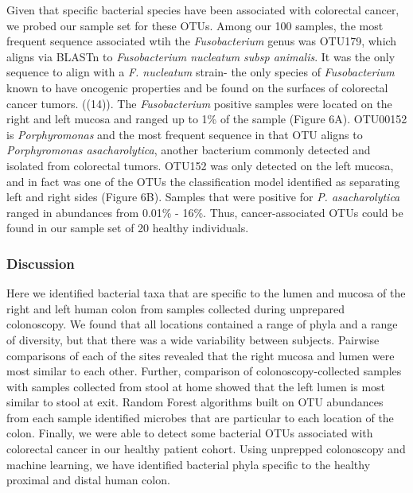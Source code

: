 \documentclass[11pt,]{article}
\begin{document}
Given that specific bacterial species have been associated with
colorectal cancer, we probed our sample set for these OTUs. Among our
100 samples, the most frequent sequence associated wtih the
\emph{Fusobacterium} genus was OTU179, which aligns via BLASTn to
\emph{Fusobacterium nucleatum subsp animalis}. It was the only sequence
to align with a \emph{F. nucleatum} strain- the only species of
\emph{Fusobacterium} known to have oncogenic properties and be found on
the surfaces of colorectal cancer tumors. ((14)). The
\emph{Fusobacterium} positive samples were located on the right and left
mucosa and ranged up to 1\% of the sample (Figure 6A). OTU00152 is
\emph{Porphyromonas} and the most frequent sequence in that OTU aligns
to \emph{Porphyromonas asacharolytica}, another bacterium commonly
detected and isolated from colorectal tumors. OTU152 was only detected
on the left mucosa, and in fact was one of the OTUs the classification
model identified as separating left and right sides (Figure 6B). Samples
that were positive for \emph{P. asacharolytica} ranged in abundances
from 0.01\% - 16\%. Thus, cancer-associated OTUs could be found in our
sample set of 20 healthy individuals.

\subsubsection{Discussion}\label{discussion}

Here we identified bacterial taxa that are specific to the lumen and
mucosa of the right and left human colon from samples collected during
unprepared colonoscopy. We found that all locations contained a range of
phyla and a range of diversity, but that there was a wide variability
between subjects. Pairwise comparisons of each of the sites revealed
that the right mucosa and lumen were most similar to each other.
Further, comparison of colonoscopy-collected samples with samples
collected from stool at home showed that the left lumen is most similar
to stool at exit. Random Forest algorithms built on OTU abundances from
each sample identified microbes that are particular to each location of
the colon. Finally, we were able to detect some bacterial OTUs
associated with colorectal cancer in our healthy patient cohort. Using
unprepped colonoscopy and machine learning, we have identified bacterial
phyla specific to the healthy proximal and distal human colon.
\end{document}
